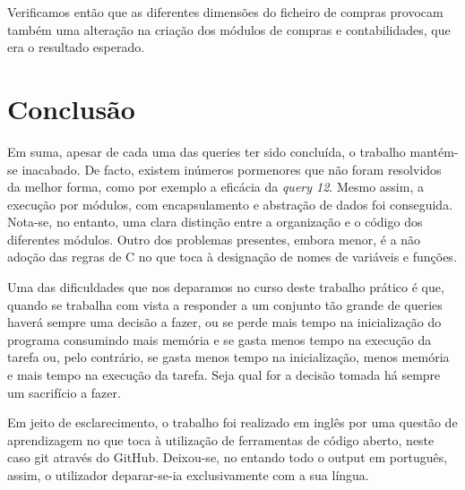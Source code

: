 \documentclass[10pt] {article}
\begin{document}
\begin{center}
\end{center}
\par Verificamos então que as diferentes dimensões do ficheiro de compras provocam também uma alteração na 
criação dos módulos de compras e contabilidades, que era o resultado esperado.

\newpage
\section{Conclusão}

\indent\par Em suma, apesar de cada uma das queries ter sido concluída, o trabalho mantém-se inacabado. De
facto, existem inúmeros pormenores que não foram resolvidos da melhor forma, como por exemplo a
eficácia da \emph{query 12}. Mesmo assim, a execução por módulos, com encapsulamento e abstração de dados
foi conseguida. Nota-se, no entanto, uma clara distinção entre a organização e o código dos diferentes módulos.
Outro dos problemas presentes, embora menor, é a não adoção das regras de C no que toca à designação de
nomes de variáveis e funções.
\par Uma das dificuldades que nos deparamos no curso deste trabalho prático é que, quando se trabalha com vista a responder a um conjunto tão grande de queries
haverá sempre uma decisão a fazer, ou se perde mais tempo na inicialização do programa consumindo mais memória e se gasta
menos tempo na execução da tarefa ou, pelo contrário, se gasta menos tempo na inicialização, menos memória e mais tempo na
execução da tarefa. Seja qual for a decisão tomada há sempre um sacrifício a fazer.
\par Em jeito de esclarecimento, o trabalho foi realizado em inglês por uma questão de aprendizagem no que toca à
utilização de ferramentas de código aberto, neste caso git através do GitHub. Deixou-se, no entando todo o output em português, assim, o utilizador
deparar-se-ia exclusivamente com a sua língua.
\end{document}
